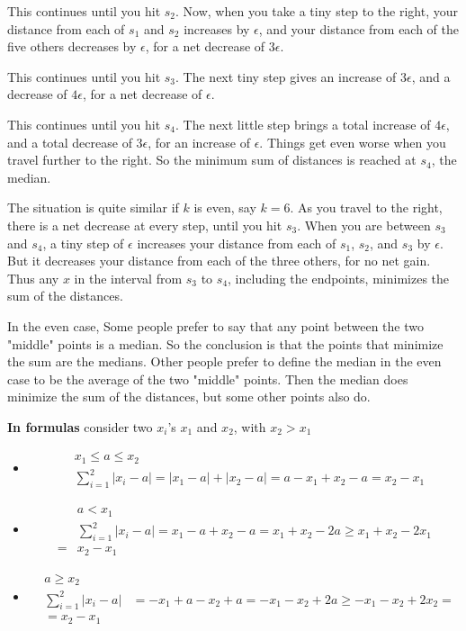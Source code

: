 \documentclass[12pt, letterpaper]{article}
\theoremstyle{definition}
\begin{document}
This continues until you hit $s_2$. Now, when you take a tiny step to the right, your distance from each of $s_1$ and $s_2$ increases by $\epsilon$, and your distance from each of the five others decreases by $\epsilon$, for a net decrease of $3\epsilon$.

This continues until you hit $s_3$. The next tiny step gives an increase of $3\epsilon$, and a decrease of $4\epsilon$, for a net decrease of $\epsilon$.

This continues until you hit $s_4$. The next little step brings a total increase of $4\epsilon$, and a total decrease of $3\epsilon$, for an increase of $\epsilon$. Things get even worse when you travel further to the right. So the minimum sum of distances is reached at $s_4$, the median.

The situation is quite similar if $k$ is even, say $k=6$. As you travel to the right, there is a net decrease at every step, until you hit $s_3$. When you are between $s_3$ and $s_4$, a tiny step of $\epsilon$ increases your distance from each of $s_1$, $s_2$, and $s_3$ by $\epsilon$. But it decreases your distance from each of the three others, for no net gain. Thus any $x$ in the interval from  $s_3$ to $s_4$, including the endpoints, minimizes the sum of the distances. 

In the even case, Some people prefer to say that any point between the two "middle" points is a median. So the conclusion is that the points that minimize the sum are the medians. Other people prefer to define the median in the even case to be the average of the two "middle" points. Then the median does minimize the sum of the distances, but some other points also do.

\textbf{In formulas} consider two $x_i$'s $x_1$ and $x_2$, with $x_2>x_1$
\begin{itemize}
\item \begin{equation}\begin{aligned}
&x_1\leq a\leq x_2
\\ &\sum_{i=1}^{2}|x_i-a|=|x_1-a|+|x_2-a|=a-x_1+x_2-a=x_2-x_1
\end{aligned}\end{equation}
\item \begin{equation}\begin{aligned}
&a < x_1
\\&\sum_{i=1}^{2}|x_i-a|=x_1-a+x_2-a=x_1+x_2-2a\ge x_1+x_2-2x_1\\=&x_2-x_1
\end{aligned}\end{equation}
\item \begin{equation}\begin{aligned}
&a\ge x_2
\\&\sum_{i=1}^{2}|x_i-a|&=-x_1+a-x_2+a=-x_1-x_2+2a\ge -x_1-x_2+2x_2=\\
&=x_2 - x_1
\end{aligned}
\end{equation}

\end{itemize}
\end{document}
